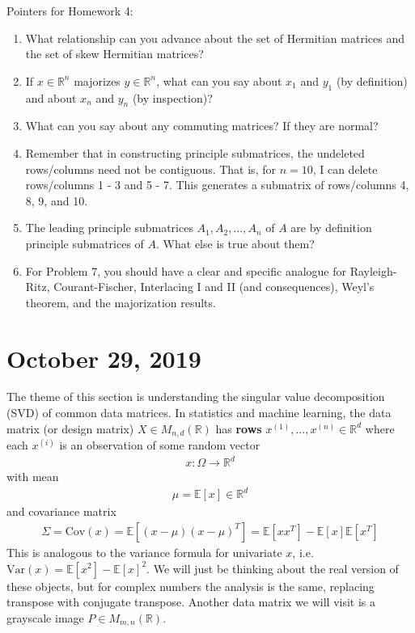 \documentclass[11pt]{article}
\newcommand{\R}{\ensuremath{\mathbb R}}
\newcommand{\EV}{\ensuremath{\mathbb E}}
\newcommand{\Var}{\text{Var}}
\newcommand{\Cov}{\text{Cov}}
\theoremstyle{plain}
\theoremstyle{definition}
\theoremstyle{remark}
\begin{document}
Pointers for Homework 4:
\begin{enumerate}
        \item What relationship can you advance about the set of Hermitian matrices and the set of skew Hermitian matrices?
        \item If $x \in \R^n$ majorizes $y \in \R^n$, what can you say about $x_1$ and $y_1$ (by definition) and about $x_n$ and $y_n$ (by inspection)?
        \item What can you say about any commuting matrices? If they are normal?
        \item Remember that in constructing principle submatrices, the undeleted rows/columns need not be contiguous. That is, for $n = 10$, I can delete rows/columns 1 - 3 and 5 - 7. This generates a submatrix of rows/columns 4, 8, 9, and 10.
        \item The leading principle submatrices $A_1, A_2, ..., A_n$ of $A$ are by definition principle submatrices of $A$. What else is true about them?
        \item For Problem 7, you should have a clear and specific analogue for Rayleigh-Ritz, Courant-Fischer, Interlacing I and II (and consequences), Weyl's theorem, and the majorization results.
\end{enumerate}

\section{October 29, 2019}

The theme of this section is understanding the singular value decomposition (SVD) of common data matrices. In statistics and machine learning, the data matrix (or design matrix) $X \in M_{n, d}(\R)$ has {\bf rows} $x^{(1)}, ..., x^{(n)} \in \R^d$ where each $x^{(i)}$ is an observation of some random vector
\begin{align*}
    x: \Omega \rightarrow \R^d
\end{align*}
with mean
\begin{align*}
    \mu = \EV[x] \in \R^d
\end{align*}
and covariance matrix
\begin{align*}
    \Sigma = \Cov(x) = \EV[(x - \mu)(x - \mu)^T] = \EV[xx^T] - \EV[x]\EV[x^T]
\end{align*}
This is analogous to the variance formula for univariate $x$, i.e. $\Var(x) = \EV[x^2] - \EV[x]^2$. We will just be thinking about the real version of these objects, but for complex numbers the analysis is the same, replacing transpose with conjugate transpose. Another data matrix we will visit is a grayscale image $P \in M_{m,n}(\R)$. 
\end{document}
